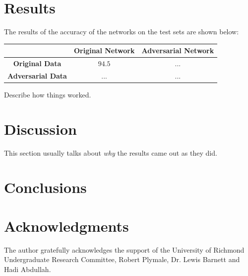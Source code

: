 \documentclass[11pt]{article}
\begin{document}
\section{Results}
The results of the accuracy of the networks on the test sets are shown below:
\begin{table}[H]
	\begin{center}
		\begin{tabular}{||c c c||}
		\hline
		& \textbf{Original Network} & \textbf{Adversarial Network}\\
		\hline
		\textbf{Original Data} & $94.5$ & ...\\
		\hline
		\textbf{Adversarial Data} & ... &...\\
		\hline
		\end{tabular}
	\end{center}
\end{table}


\label{sec:results}

Describe how things worked.

\section{Discussion}

This section usually talks about {\em why} the results came out
as they did.

\section{Conclusions}


\section{Acknowledgments}
The author gratefully acknowledges the support of
the University of Richmond Undergraduate Research Committee,
Robert Plymale, Dr. Lewis Barnett and Hadi Abdullah.

\newpage



\end{document}
